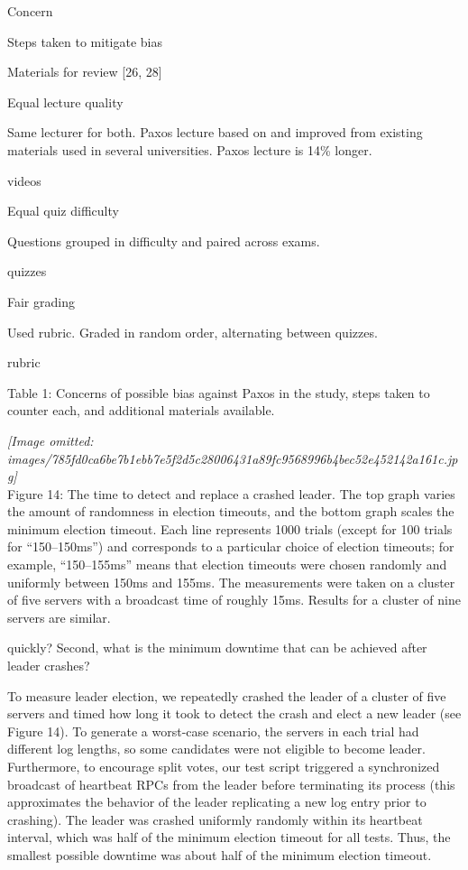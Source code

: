 \documentclass[
]{article}
\begin{document}
Concern

Steps taken to mitigate bias

Materials for review {[}26, 28{]}

Equal lecture quality

Same lecturer for both. Paxos lecture based on and improved from
existing materials used in several universities. Paxos lecture is 14\%
longer.

videos

Equal quiz difficulty

Questions grouped in difficulty and paired across exams.

quizzes

Fair grading

Used rubric. Graded in random order, alternating between quizzes.

rubric

Table 1: Concerns of possible bias against Paxos in the study, steps
taken to counter each, and additional materials available.

\textit{[Image omitted: images/785fd0ca6be7b1ebb7e5f2d5c28006431a89fc9568996b4bec52e452142a161c.jpg]}\\
Figure 14: The time to detect and replace a crashed leader. The top
graph varies the amount of randomness in election timeouts, and the
bottom graph scales the minimum election timeout. Each line represents
1000 trials (except for 100 trials for ``150--150ms'') and corresponds
to a particular choice of election timeouts; for example, ``150--155ms''
means that election timeouts were chosen randomly and uniformly between
150ms and 155ms. The measurements were taken on a cluster of five
servers with a broadcast time of roughly 15ms. Results for a cluster of
nine servers are similar.

quickly? Second, what is the minimum downtime that can be achieved after
leader crashes?

To measure leader election, we repeatedly crashed the leader of a
cluster of five servers and timed how long it took to detect the crash
and elect a new leader (see Figure 14). To generate a worst-case
scenario, the servers in each trial had different log lengths, so some
candidates were not eligible to become leader. Furthermore, to encourage
split votes, our test script triggered a synchronized broadcast of
heartbeat RPCs from the leader before terminating its process (this
approximates the behavior of the leader replicating a new log entry
prior to crashing). The leader was crashed uniformly randomly within its
heartbeat interval, which was half of the minimum election timeout for
all tests. Thus, the smallest possible downtime was about half of the
minimum election timeout.
\end{document}
